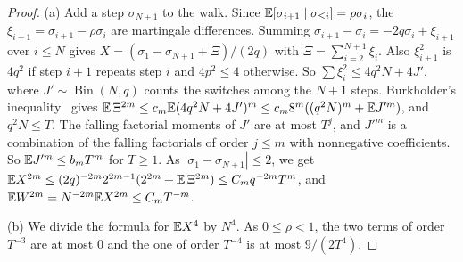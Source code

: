 \begin{proof}
(a) Add a step $\sigma_{N+1}$ to the walk. Since
$\mathbb E[\sigma_{i+1}\mid\sigma_{\le i}]=\rho\sigma_i$, the
$\xi_{i+1}=\sigma_{i+1}-\rho\sigma_i$ are martingale differences. Summing
$\sigma_{i+1}-\sigma_i=-2q\sigma_i+\xi_{i+1}$ over $i\le N$ gives
$X=(\sigma_1-\sigma_{N+1}+\Xi)/(2q)$ with $\Xi=\sum_{i=2}^{N+1}\xi_i$. Also
$\xi_{i+1}^2$ is $4q^2$ if step $i+1$ repeats step $i$ and $4p^2\le4$
otherwise. So $\sum\xi_i^2\le4q^2N+4J'$, where $J'\sim\operatorname{Bin}(N,q)$
counts the switches among the $N+1$ steps. Burkholder's
inequality~\cite[Ch.~2]{hallheyde1980} gives
$\mathbb E\,\Xi^{2m}\le c_m\mathbb E(4q^2N+4J')^m\le c_m8^m((q^2N)^m+\mathbb E J'^m)$, and
$q^2N\le T$. The falling factorial moments of $J'$ are at most $T^j$, and
$J'^m$ is a combination of the falling factorials of order $j\le m$ with
nonnegative coefficients. So
$\mathbb E J'^m\le b_mT^m$ for $T\ge1$. As $|\sigma_1-\sigma_{N+1}|\le2$,
we get $\mathbb E X^{2m}\le(2q)^{-2m}2^{2m-1}(2^{2m}+\mathbb E\,\Xi^{2m})\le C_mq^{-2m}T^m$,
and $\mathbb E W^{2m}=N^{-2m}\mathbb E X^{2m}\le C_mT^{-m}$.

(b) We divide the formula for $\mathbb E X^4$ by $N^4$. As $0\le\rho<1$, the two terms
of order $T^{-3}$ are at most $0$ and the one of order $T^{-4}$ is at most
$9/(2T^4)$.
\end{proof}

